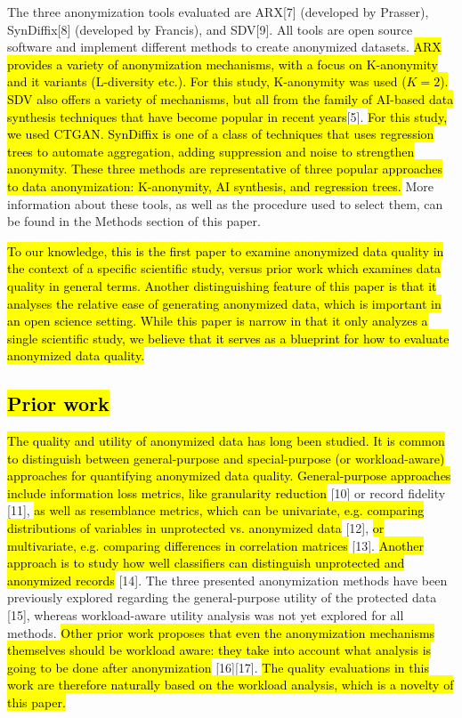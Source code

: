 \documentclass[10pt]{article}
\newcommand{\mycite}[1]{[#1]}
\begin{document}
The three anonymization tools evaluated are ARX\mycite{7} (developed by Prasser), SynDiffix\mycite{8} (developed by Francis), and SDV\mycite{9}. All tools are open source software and implement different methods to create anonymized datasets. \hl{
ARX provides a variety of anonymization mechanisms, with a focus on K-anonymity and it variants (L-diversity etc.). For this study, K-anonymity was used ($K=2$). SDV also offers a variety of mechanisms, but all from the family of AI-based data synthesis techniques that have become popular in recent years}\mycite{5}. \hl{For this study, we used CTGAN. SynDiffix is one of a class of techniques that uses regression trees to automate aggregation, adding suppression and noise to strengthen anonymity. These three methods are representative of three popular approaches to data anonymization: K-anonymity, AI synthesis, and regression trees.} More information about these tools, as well as the procedure used to select them, can be found in the Methods section of this paper.

\hl{To our knowledge, this is the first paper to examine anonymized data quality in the context of a specific scientific study, versus prior work which examines data quality in general terms. Another distinguishing feature of this paper is that it analyses the relative ease of generating anonymized data, which is important in an open science setting. While this paper is narrow in that it only analyzes a single scientific study, we believe that it serves as a blueprint for how to evaluate anonymized data quality.}

\subsection*{\hl{Prior work}}

\hl{The quality and utility of anonymized data has long been studied. It is common to distinguish between general-purpose and special-purpose (or workload-aware) approaches for quantifying anonymized data quality. General-purpose approaches include information loss metrics, like granularity reduction} \mycite{10} or record fidelity \mycite{11}, \hl{as well as resemblance metrics, which can be univariate, e.g. comparing distributions of variables in unprotected vs. anonymized data} \mycite{12}, \hl{or multivariate, e.g. comparing differences in correlation matrices} \mycite{13}. \hl{Another approach is to study how well classifiers can distinguish unprotected and anonymized records} \mycite{14}. The three presented anonymization methods have been previously explored regarding the general-purpose utility of the protected data \mycite{15}, whereas workload-aware utility analysis was not yet explored for all methods. 
\hl{Other prior work proposes that even the anonymization mechanisms themselves should be workload aware: they take into account what analysis is going to be done after anonymization} \mycite{16}\mycite{17}. \hl{The quality evaluations in this work are therefore naturally based on the workload analysis, which is a novelty of this paper.}
\end{document}
